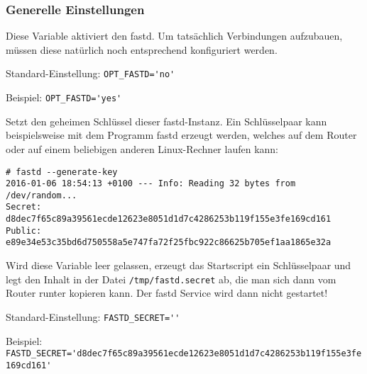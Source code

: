 \subsubsection{Generelle Einstellungen}

\begin{description}

Diese Variable aktiviert den fastd. Um tatsächlich Verbindungen
aufzubauen, müssen diese natürlich noch entsprechend konfiguriert
werden.

Standard-Einstellung: \verb+OPT_FASTD='no'+

Beispiel: \verb+OPT_FASTD='yes'+


Setzt den geheimen Schlüssel dieser fastd-Instanz. Ein Schlüsselpaar
kann beispielsweise mit dem Programm fastd erzeugt werden, welches auf
dem Router oder auf einem beliebigen anderen Linux-Rechner laufen kann:

\begin{example}
\begin{verbatim}
# fastd --generate-key
2016-01-06 18:54:13 +0100 --- Info: Reading 32 bytes from /dev/random...
Secret: d8dec7f65c89a39561ecde12623e8051d1d7c4286253b119f155e3fe169cd161
Public: e89e34e53c35bd6d750558a5e747fa72f25fbc922c86625b705ef1aa1865e32a
\end{verbatim}
\end{example}

Wird diese Variable leer gelassen, erzeugt das Startscript ein
Schlüsselpaar und legt den Inhalt in der Datei
\texttt{/tmp/fastd.secret} ab, die man sich dann vom Router runter
kopieren kann. Der fastd Service wird dann nicht gestartet!

Standard-Einstellung: \verb+FASTD_SECRET=''+

Beispiel: \verb+FASTD_SECRET='d8dec7f65c89a39561ecde12623e8051d1d7c4286253b119f155e3fe169cd161'+

\end{description}

